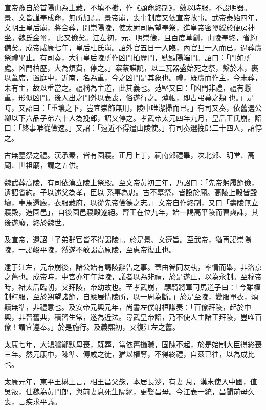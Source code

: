 \begin{pinyinscope}
 宣帝豫自於首陽山為土藏，不填不樹，作《顧命終制》，斂以時服，不設明器。景、文皆謹奉成命，無所加焉。景帝崩，喪事制度又依宣帝故事。武帝泰始四年，文明王皇后崩，將合葬，開崇陽陵，使太尉司馬望奉祭，進皇帝密璽綬於便房神坐。魏氏金璽，
 此又儉矣。江左初，元、明崇儉，且百度草創，山陵奉終，省約備矣。成帝咸康七年，皇后杜氏崩。詔外官五日一入臨，內官旦一入而已，過葬虞祭禮畢止。有司奏，大行皇后陵所作凶門柏歷門，號顯陽端門。詔曰：「門如所處。凶門柏歷，大為煩費，停之。」案蔡謨說，以二瓦器盛始死之祭，繫於木，裹以葦席，置庭中，近南，名為重，今之凶門是其象也。禮，既虞而作主，今未葬，未有主，故以重當之。禮稱為主道，此其義也。范堅又曰：「凶門非禮，禮有懸重，形似凶門。後人出之門外以表喪，俗遂行之。薄帳，即古弔幕之類
 也。」是時，又詔曰：「重壤之下，豈宜崇飾無用，陵中唯潔掃而已。」有司又奏，依舊選公卿以下六品子弟六十人為挽郎，詔又停之。孝武帝太元四年九月，皇后王氏崩。詔曰：「終事唯從儉速。」又詔：「遠近不得遣山陵使。」有司奏選挽郎二十四人，詔停之。



 古無墓祭之禮。漢承秦，皆有園寢。正月上丁，祠南郊禮畢，次北郊、明堂、高廟、世祖廟，謂之五供。



 魏武葬高陵，有司依漢立陵上祭殿。至文帝黃初三年，乃詔曰：「先帝躬履節儉，遺詔省約。子以述父為孝，臣以
 系事為忠。古不墓祭，皆設於廟。高陵上殿皆毀壞，車馬還廄，衣服藏府，以從先帝儉德之志。」文帝自作終制，又曰「壽陵無立寢殿，造園邑」，自後園邑寢殿遂絕。齊王在位九年，始一謁高平陵而曹爽誅，其後遂廢，終於魏世。



 及宣帝，遺詔「子弟群官皆不得謁陵」。於是景、文遵旨。至武帝，猶再謁崇陽陵，一謁峻平陵，然遂不敢謁高原陵，至惠帝復止也。



 逮于江左，元帝崩後，諸公始有謁陵辭告之事。蓋由眷同友執，率情而舉，非洛京之舊也。成帝時，中宮亦年年拜陵，議者以為非禮，於是遂止，以為永制。至穆帝時，褚太后臨朝，又拜陵，帝幼故也。至孝武崩，
 驃騎將軍司馬道子曰：「今雖權制釋服，至於朔望諸節，自應展情陵所，以一周為斷。」於是至陵，變服單衣，煩黷無準，非禮意也。及安帝元興元年，尚書左僕射桓謙奏：「百僚拜陵，起於中興，非晉舊典，積習生常，遂為近法。尋武皇帝詔，乃不使人主諸王拜陵，豈唯百僚！謂宜遵奉。」於是施行。及義熙初，又復江左之舊。



 太康七年，大鴻臚鄭默母喪，既葬，當依舊攝職，固陳不起，於是始制大臣得終喪三年。然元康中，陳準、傅咸之徒，猶以權奪，不得終禮，自茲已往，以為成比也。



 太康元年，東平王楙上言，相王昌父毖，本居長沙，有妻
 息，漢末使入中國，值吳叛，仕魏為黃門郎，與前妻息死生隔絕，更娶昌母。今江表一統，昌聞前母久喪，言疾求平議。




\end{pinyinscope}
